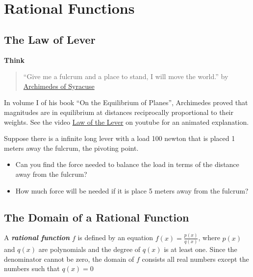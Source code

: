 \documentclass[en,12pt]{elegantbook}
\providecommand{\tightlist}{%
  \setlength{\itemsep}{0pt}\setlength{\parskip}{0pt}}
\newenvironment{rmdthink}{
	\par\noindent
	{
		\makebox[-\width][r]{
			\footnotesize
			\color{green!90}\faLightbulbO
			\hspace*{3pt}
		}
			\textbf{
				\color{second}
				Think 
			}
    }
    \begin{shaded}
    \sffamily
}{
    \par\medskip\ignorespacesafterend
    \end{shaded}
}
\providecommand{\tightlist}{%
  \setlength{\itemsep}{0pt}\setlength{\parskip}{0pt}}
\begin{document}
\hypertarget{rational-functions}{%
\chapter{Rational Functions}\label{rational-functions}}

\hypertarget{the-law-of-lever}{%
\section{The Law of Lever}\label{the-law-of-lever}}

\begin{rmdthink}

\begin{quote}
``Give me a fulcrum and a place to stand, I will move the world.'' by \href{https://en.wikipedia.org/wiki/Archimedes\#Mathematics}{Archimedes of Syracuse}
\end{quote}

In volume I of his book ``On the Equilibrium of Planes'', Archimedes proved that magnitudes are in equilibrium at distances reciprocally proportional to their weights. See the video \href{https://youtu.be/yhrR4384SGE?t=8}{Law of the Lever} on youtube for an animated explanation.

Suppose there is a infinite long lever with a load 100 newton that is placed 1 meters away the fulcrum, the pivoting point.

\begin{itemize}
\tightlist
\item
  Can you find the force needed to balance the load in terms of the distance away from the fulcrum?
\item
  How much force will be needed if it is place 5 meters away from the fulcrum?
\end{itemize}

\end{rmdthink}

\hypertarget{the-domain-of-a-rational-function}{%
\section{The Domain of a Rational Function}\label{the-domain-of-a-rational-function}}

A \textbf{\emph{rational function}} \(f\) is defined by an equation \(f(x)=\frac{p(x)}{q(x)}\), where \(p(x)\) and \(q(x)\) are polynomials and the degree of \(q(x)\) is at least one. Since the denominator cannot be zero, the domain of \(f\) consists all real numbers except the numbers such that \(q(x)=0\)
\end{document}
